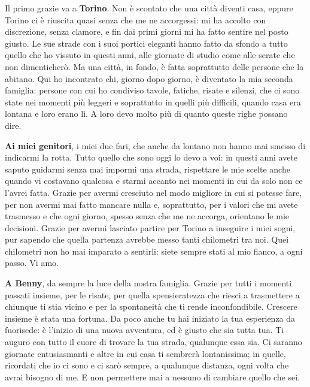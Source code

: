 {\setlength{\parindent}{0pt}\setlength{\parskip}{0.9\baselineskip}

Il primo grazie va a \textbf{Torino}. Non è scontato che una città diventi casa, eppure Torino ci è riuscita quasi senza che me ne accorgessi: mi ha accolto con discrezione, senza clamore, e fin dai primi giorni mi ha fatto sentire nel posto giusto. Le sue strade con i suoi portici eleganti hanno fatto da sfondo a tutto quello che ho vissuto in questi anni, alle giornate di studio come alle serate che non dimenticherò. Ma una città, in fondo, è fatta soprattutto delle persone che la abitano. Qui ho incontrato chi, giorno dopo giorno, è diventato la mia seconda famiglia: persone con cui ho condiviso tavole, fatiche, risate e silenzi, che ci sono state nei momenti più leggeri e soprattutto in quelli più difficili, quando casa era lontana e loro erano lì. A loro devo molto più di quanto queste righe possano dire.

\textbf{Ai miei genitori}, i miei due fari, che anche da lontano non hanno mai smesso di indicarmi la rotta. Tutto quello che sono oggi lo devo a voi: in questi anni avete saputo guidarmi senza mai impormi una strada, rispettare le mie scelte anche quando vi costavano qualcosa e starmi accanto nei momenti in cui da solo non ce l'avrei fatta. Grazie per avermi cresciuto nel modo migliore in cui si potesse fare, per non avermi mai fatto mancare nulla e, soprattutto, per i valori che mi avete trasmesso e che ogni giorno, spesso senza che me ne accorga, orientano le mie decisioni. Grazie per avermi lasciato partire per Torino a inseguire i miei sogni, pur sapendo che quella partenza avrebbe messo tanti chilometri tra noi. Quei chilometri non ho mai imparato a sentirli: siete sempre stati al mio fianco, a ogni passo. Vi amo.

\textbf{A Benny}, da sempre la luce della nostra famiglia. Grazie per tutti i momenti passati insieme, per le risate, per quella spensieratezza che riesci a trasmettere a chiunque ti stia vicino e per la spontaneità che ti rende inconfondibile. Crescere insieme è stata una fortuna. Da poco anche tu hai iniziato la tua esperienza da fuorisede: è l'inizio di una nuova avventura, ed è giusto che sia tutta tua. Ti auguro con tutto il cuore di trovare la tua strada, qualunque essa sia. Ci saranno giornate entusiasmanti e altre in cui casa ti sembrerà lontanissima; in quelle, ricordati che io ci sono e ci sarò sempre, a qualunque distanza, ogni volta che avrai bisogno di me. E non permettere mai a nessuno di cambiare quello che sei.

}
